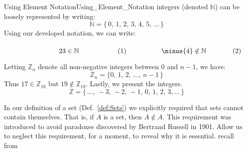\begin{fexample}{Using Element Notation}{Using_Element_Notation}
        integers (denoted $\mathbb{N}$) can be loosely represented by writing:
        \begin{equation}
            \label{eqn:Natural_Numbers_Ellipses}%
            \mathbb{N}=\big\{\,0,\,1,\,2,\,3,\,4,\,5,\,\dots\,\big\}
        \end{equation}
        Using our developed notation, we can write:
        \par\hfill\par
        \begin{subequations}
            \begin{minipage}[b]{0.49\textwidth}
                \begin{equation}
                    23\in\mathbb{N}
                \end{equation}
            \end{minipage}
            \hfill
            \begin{minipage}[b]{0.49\textwidth}
                \begin{equation}
                    \minus{4}\notin\mathbb{N}
                \end{equation}
            \end{minipage}
        \end{subequations}
        \par\vspace{2.5ex}
        Letting $\mathbb{Z}_{n}$ denote all non-negative integers between 0 and
        $n-1$, we have:
        \begin{equation}
            \label{eqn:Z_n_Ellipses}%
            \mathbb{Z}_{n}=\big\{0,\,1,\,2,\,\dots,\,n-1\,\big\}
        \end{equation}
        Thus $17\in\mathbb{Z}_{18}$ but $19\notin\mathbb{Z}_{18}$. Lastly, we
        present the integers.
        \begin{equation}
            \label{eqn:Integers_Ellipses}%
            \mathbb{Z}=\big\{\,\dots,\,\minus{3},\,\minus{2},\,\minus{1},
                             \,0,\,1,\,2,\,3,\dots\,\big\}
        \end{equation}
    \end{fexample}
    In our definition of a set (Def.~\ref{def:Sets}) we explicitly required
    that sets cannot contain themselves. That is, if $A$ is a set, then
    $A\notin{A}$. This requirement was introduced to avoid paradoxes discovered
    by Bertrand Russell in 1901. Allow us to neglect
    this requirement, for a moment, to reveal why it is essential. recall from
